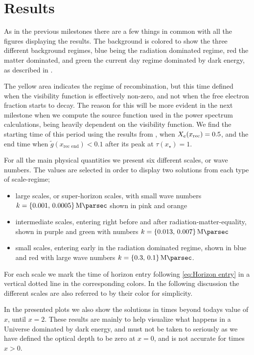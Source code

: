 \documentclass[10pt,a4paper]{article}
\begin{document}
\section{Results}
\label{sec:Results}
As in the previous milestones there are a few things in common with all the figures displaying the results. The background is colored to show the three different background regimes, blue being the radiation dominated regime, red the matter dominated, and green the current day regime dominated by dark energy, as described in \cite{milestone1}. 

The yellow area indicates the regime of recombination, but this time defined when the visibility function is effectively non-zero, and not when the free electron fraction starts to decay. The reason for this will be more evident in the next milestone when we compute the source function used in the power spectrum calculations, being heavily dependent on the visibility function. We find the starting time of this period using the results from \cite{milestone2}, when $X_e(x_{\rm{rec}}) = 0.5$, and the end time when $\tilde{g}(x_{\textrm{rec end}}) < 0.1$ after its peak at $\tau(x_\star) =1$.

For all the main physical quantities we present six different scales, or wave numbers. The values are selected in order to display two solutions from each type of scale-regime;
\begin{itemize}
\item large scales, or super-horizon scales, with small wave numbers $k=\{0.001,\,0.0005\}\,\si{\per\mega\parsec}$ shown in pink and orange
\item intermediate scales, entering right before and after radiation-matter-equality, shown in purple and green  with numbers $k=\{0.013,\,0.007\}\,\si{\per\mega\parsec}$
\item small scales, entering early in the radiation dominated regime, shown in blue and red  with large wave numbers $k=\{0.3,\,0.1\}\,\si{\per\mega\parsec}$.
\end{itemize}
For each scale we mark the time of horizon entry following \cref{eq:Horizon entry} in a vertical dotted line in the corresponding colors. In the following discussion the different scales are also referred to by their color for simplicity.

In the presented plots we also show the solutions in times beyond todays value of $x$, until $x=2$. These results are mainly to help visualize what happens in a Universe dominated by dark energy, and must not be taken to seriously as we have defined the optical depth to be zero at $x=0$, and is not accurate for times $x>0$.
\end{document}

